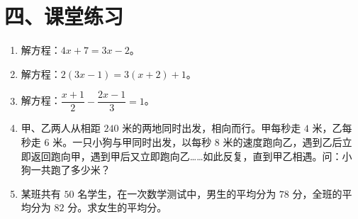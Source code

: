 \documentclass[12pt, a4paper]{ctexart}
\begin{document}
\section*{\textcolor{tipgreen}{四、课堂练习}}

\begin{enumerate}
  \item 解方程：$4x+7=3x-2$。

  \item 解方程：$2(3x-1)=3(x+2)+1$。

  \item 解方程：$\dfrac{x+1}{2}-\dfrac{2x-1}{3}=1$。

  \item 甲、乙两人从相距 $240$ 米的两地同时出发，相向而行。甲每秒走 $4$ 米，乙每秒走 $6$ 米。一只小狗与甲同时出发，以每秒 $8$ 米的速度跑向乙，遇到乙后立即返回跑向甲，遇到甲后又立即跑向乙……如此反复，直到甲乙相遇。问：小狗一共跑了多少米？

  \item 某班共有 $50$ 名学生，在一次数学测试中，男生的平均分为 $78$ 分，全班的平均分为 $82$ 分。求女生的平均分。
\end{enumerate}

\vspace{10pt}
\end{document}
